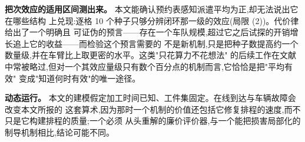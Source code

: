 \documentclass[manuscript,screen,review]{acmart}
\newcommand{\NSeeds}{10}
\begin{document}
\textbf{把次效应的适用区间测出来。} 本文能确认预约表感知派遣平均为正,却无法说出它在哪些结构
上兑现:逐格 \NSeeds{} 个种子只够分辨闭环那一级的效应(局限 (2))。代价律给出了一个明确且
可证伪的预言——存在一个车队规模,超过它之后试探的开销增长追上它的收益——而检验这个预言需要的
不是新机制,只是把种子数提高约一个数量级,并在车臂比上取更密的水平。这类"只花算力不花想法"
的后续工作在文献中常被略过,但对一个其效应量级只有数个百分点的机制而言,它恰恰是把"平均有效"
变成"知道何时有效"的唯一途径。

\textbf{动态运行。} 本文的建模假定加工时间已知、工件集固定。在线到达与车辆故障会改变本文所报的
这套算术,因为那时一个机制的价值还包括它修复排程的速度,而不只是它构建排程的质量;一个必须
从头重解的廉价评价器,与一个能把损害局部化的制导机制相比,结论可能不同。







\end{document}
